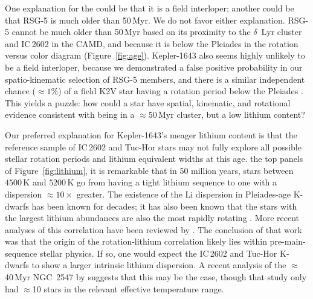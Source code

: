 \documentclass[12pt,twocolumn,tighten,linenumbers,trackchanges]{aastex63}
\begin{document}
One explanation for the  could be that it is a field
interloper; another could be that RSG-5 is much older than 50\,Myr.  We do
not favor either explanation.  
RSG-5 cannot be much older than 50\,Myr
based on its proximity to the $\delta$~Lyr cluster and IC\,2602 in the
CAMD, and because it is below the Pleiades in the 
rotation versus color diagram (Figure~\ref{fig:age}).
Kepler-1643 also seems highly unlikely to be a field interloper, 
because we demonstrated a  false positive probability
in our spatio-kinematic selection of RSG-5 members, and there is a 
similar independent chance
($\approx$$1\%$) of a field K2V star having a rotation period below the
Pleiades \citep{mcquillan_rotation_2014}.
This yields a puzzle: how could a star have spatial, kinematic, and rotational
evidence consistent with being in a $\approx$50\,Myr cluster,
but a low lithium content?

Our preferred explanation for Kepler-1643's meager lithium 
content is that the reference sample of IC\,2602 and Tuc-Hor
stars may not fully explore all possible stellar rotation
periods and lithium equivalent widths at this age.
the top panels of Figure~\ref{fig:lithium}, it is  remarkable that in
50 million years, stars between $4500$\,K and $5200$\,K go from
having a tight lithium sequence to one with a dispersion
$\approx10\times$ greater.  The existence of the Li dispersion in
Pleiades-age K-dwarfs has been known for decades; it has also been
known that the stars with the largest lithium abundances are also the
most rapidly rotating
\citep{butler_pleiades_1987,soderblom_evolution_1993}.  More recent
analyses of this correlation have been reviewed by
\citet{bouvier_lithium-rotation_2020}.  The conclusion of that work
was that the origin of the rotation-lithium correlation likely lies
within pre-main-sequence stellar physics.  If so, one would expect the
IC\,2602 and Tuc-Hor K-dwarfs to show a larger intrinsic lithium
dispersion.  A recent analysis of the $\approx$40\,Myr
NGC~2547 by \citet{binks_2022} suggests that this may
be the case, though that study only had $\approx$10 stars in the relevant
effective temperature range.
\end{document}
